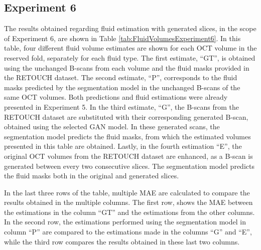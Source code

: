 \subsection{Experiment 6}

The results obtained regarding fluid estimation with generated slices, in the scope of Experiment 6, are shown in Table  \ref{tab:FluidVolumesExperiment6}. In this table, four different fluid volume estimates are shown for each OCT volume in the reserved fold, separately for each fluid type. The first estimate, ``GT'', is obtained using the unchanged B-scans from each volume and the fluid masks provided in the RETOUCH dataset. The second estimate, ``P'', corresponds to the fluid masks predicted by the segmentation model in the unchanged B-scans of the same OCT volumes. Both predictions and fluid estimations were already presented in Experiment 5. In the third estimate, ``G'', the B-scans from the RETOUCH dataset are substituted with their corresponding generated B-scan, obtained using the selected GAN model. In these generated scans, the segmentation model predicts the fluid masks, from which the estimated volumes presented in this table are obtained. Lastly, in the fourth estimation ``E'', the original OCT volumes from the RETOUCH dataset are enhanced, as a B-scan is generated between every two consecutive slices. The segmentation model predicts the fluid masks both in the original and generated slices.
\par
In the last three rows of the table, multiple MAE are calculated to compare the results obtained in the multiple columns. The first row, shows the MAE between the estimations in the column ``GT'' and the estimations from the other columns. In the second row, the estimations performed using the segmentation model in column ``P'' are compared to the estimations made in the columns ``G'' and ``E'', while the third row compares the results obtained in these last two columns.


